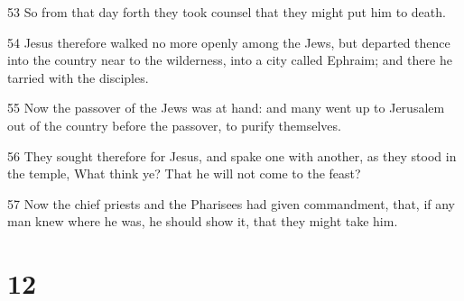 \par 53 So from that day forth they took counsel that they might put him to death.
\par 54 Jesus therefore walked no more openly among the Jews, but departed thence into the country near to the wilderness, into a city called Ephraim; and there he tarried with the disciples.
\par 55 Now the passover of the Jews was at hand: and many went up to Jerusalem out of the country before the passover, to purify themselves.
\par 56 They sought therefore for Jesus, and spake one with another, as they stood in the temple, What think ye? That he will not come to the feast?
\par 57 Now the chief priests and the Pharisees had given commandment, that, if any man knew where he was, he should show it, that they might take him.

\chapter{12}

